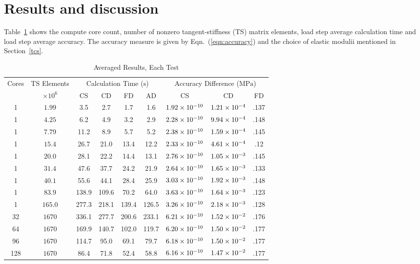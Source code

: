\documentclass[preprint,12pt]{elsarticle}
\begin{document}
\section{Results and discussion}
\label{sec:Res}
%
Table~\ref{tab:results} shows the compute core count, number of nonzero tangent-stiffness (TS) matrix elements, load step average calculation time and load step average accuracy. The accuracy measure is given by Eqn.~(\ref{eqn:accuracy}) and the choice of elastic modulii mentioned in Section~\ref{tcs}.
%
\begin{table}[!ht]    
  \scriptsize
  \centering
        \caption{Averaged Results, Each Test} \label{tab:results}   
       \begin{tabular}{c c c c c c c c c}
         \toprule
         Cores & TS Elements & \multicolumn{4}{c}{Calculation Time ($\si{\second}$)} & \multicolumn{3}{c}{Accuracy Difference ($\si{\mega\pascal}$)} \\ 
         & $\times 10^6$ & CS & CD & FD & AD & CS & CD & FD \\
        \midrule
        1 & $\num{1.99}$  & 3.5 & 2.7 & 1.7 & 1.6 & $\num{1.92E-10}$ & $\num{1.21E-4}$ & .137 \\
        1 & $\num{4.25}$  & 6.2& 4.9& 3.2& 2.9 & $\num{2.28E-10}$ & $\num{9.94E-4}$ & .148 \\
        1 & $\num{7.79}$  & 11.2& 8.9& 5.7& 5.2 & $\num{2.38E-10}$ & $\num{1.59E-4}$ & .145\\
        1 & $\num{15.4}$  & 26.7& 21.0& 13.4& 12.2 & $\num{2.33E-10}$ & $\num{4.61E-4}$ & .12 \\
        1 & $\num{20.0}$  & 28.1& 22.2& 14.4& 13.1 & $\num{2.76E-10}$ & $\num{1.05E-3}$ & .145 \\
        1 & $\num{31.4}$  & 47.6& 37.7& 24.2& 21.9 & $\num{2.64E-10}$ & $\num{1.65E-3}$ & .133 \\
        1 & $\num{40.1}$  & 55.6& 44.1& 28.4& 25.9 & $\num{3.03E-10}$ & $\num{1.92E-3}$ & .148 \\
        1 & $\num{83.9}$  & 138.9& 109.6& 70.2& 64.0 & $\num{3.63E-10}$ & $\num{1.64E-3}$ & .123 \\
        1 & $\num{165.0}$  & 277.3& 218.1& 139.4& 126.5 & $\num{3.26E-10}$ & $\num{2.18E-3}$ & .128 \\
        32 & $\num{1670}$  & 336.1& 277.7& 200.6& 233.1 & $\num{6.21E-10}$ & $\num{1.52E-2}$ & .176 \\
        64 & $\num{1670}$  & 169.9& 140.7& 102.0& 119.7 & $\num{6.20E-10}$ & $\num{1.50E-2}$ & .177 \\
        96 & $\num{1670}$  & 114.7& 95.0& 69.1 & 79.7 & $\num{6.18E-10}$ & $\num{1.50E-2}$ & .177 \\
        128 & $\num{1670}$  & 86.4& 71.8& 52.4 &58.8 & $\num{6.16E-10}$ & $\num{1.47E-2}$ & .177 \\
        \bottomrule
    \end{tabular}
\end{table}
\end{document}
